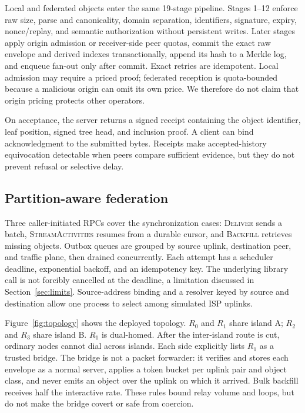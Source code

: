 \documentclass[sigconf,anonymous]{acmart}
\begin{document}
Local and federated objects enter the same 19-stage pipeline. Stages 1--12 enforce raw size, parse
and canonicality, domain separation, identifiers, signature, expiry, nonce/replay, and semantic
authorization without persistent writes. Later stages apply origin admission or receiver-side peer
quotas, commit the exact raw envelope and derived indexes transactionally, append its hash to a Merkle
log, and enqueue fan-out only after commit. Exact retries are idempotent. Local admission may require
a priced proof; federated reception is quota-bounded because a malicious origin can omit its own
price. We therefore do not claim that origin pricing protects other operators.

On acceptance, the server returns a signed receipt containing the object identifier, leaf position,
signed tree head, and inclusion proof. A client can bind acknowledgment to the submitted bytes.
Receipts make accepted-history equivocation detectable when peers compare sufficient evidence, but
they do not prevent refusal or selective delay.

\subsection{Partition-aware federation}

Three caller-initiated RPCs cover the synchronization cases: \textsc{Deliver} sends a batch,
\textsc{StreamActivities} resumes from a durable cursor, and \textsc{Backfill} retrieves missing
objects. Outbox queues are grouped by source uplink, destination peer, and traffic plane, then drained
concurrently. Each attempt has a scheduler deadline, exponential backoff, and an idempotency key.
The underlying library call is not forcibly cancelled at the deadline, a limitation discussed in
Section~\ref{sec:limits}. Source-address binding and a resolver keyed by source and destination allow
one process to select among simulated ISP uplinks.

Figure~\ref{fig:topology} shows the deployed topology. $R_0$ and $R_1$ share island A; $R_2$ and
$R_3$ share island B. $R_1$ is dual-homed. After the inter-island route is cut, ordinary nodes cannot
dial across islands. Each side explicitly lists $R_1$ as a trusted bridge. The bridge is not a packet
forwarder: it verifies and stores each envelope as a normal server, applies a token bucket per uplink
pair and object class, and never emits an object over the uplink on which it arrived. Bulk backfill
receives half the interactive rate. These rules bound relay volume and loops, but do not make the
bridge covert or safe from coercion.
\end{document}
